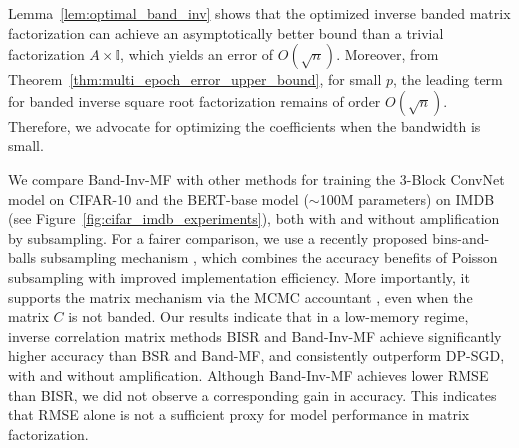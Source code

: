 \documentclass{article} %
\newcommand{\method}{banded inverse square root factorization\xspace}
\begin{document}
Lemma~\ref{lem:optimal_band_inv}  shows that the optimized inverse banded matrix factorization can achieve an asymptotically better bound than a trivial factorization $A \times \mathbb I$, which yields an error of $O(\sqrt{n})$. Moreover, from Theorem~\ref{thm:multi_epoch_error_upper_bound}, for small $p$, the leading term for \method remains of order $O(\sqrt{n})$. Therefore, we advocate for optimizing the coefficients when the bandwidth is small.

We compare Band-Inv-MF with other methods for training the 3-Block ConvNet model on CIFAR-10 and the BERT-base model ($\sim$100M parameters)  on IMDB (see Figure~\ref{fig:cifar_imdb_experiments}), both with and without amplification by subsampling. For a fairer comparison, we use a recently proposed bins-and-balls subsampling mechanism \citep{chua2024balls}, which combines the accuracy benefits of Poisson subsampling with improved implementation efficiency. More importantly, it supports the matrix mechanism via the MCMC accountant \citep{choquette2024near, choquette2023privacy}, even when the matrix $C$ is not banded. Our results indicate that in a low-memory regime, inverse correlation matrix methods BISR and Band-Inv-MF achieve significantly higher accuracy than BSR and Band-MF, and consistently outperform DP-SGD, with and without amplification. Although Band-Inv-MF achieves lower RMSE than BISR, we did not observe a corresponding gain in accuracy. This indicates that RMSE alone is not a sufficient proxy for model performance in matrix factorization.
\end{document}

